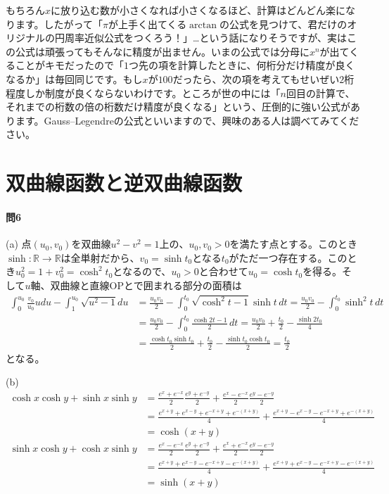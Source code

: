 もちろん$x$に放り込む数が小さくなれば小さくなるほど、計算はどんどん楽になります。したがって「$\pi$が上手く出てくる$\arctan$の公式を見つけて、君だけのオリジナルの円周率近似公式をつくろう！」…という話になりそうですが、実はこの公式は頑張ってもそんなに精度が出ません。いまの公式では分母に$x^n$が出てくることがキモだったので「$1$つ先の項を計算したときに、何桁分だけ精度が良くなるか」は毎回同じです。もし$x$が$100$だったら、次の項を考えてもせいぜい$2$桁程度しか制度が良くならないわけです。ところが世の中には「$n$回目の計算で、それまでの桁数の倍の桁数だけ精度が良くなる」という、圧倒的に強い公式があります。Gauss--Legendreの公式といいますので、興味のある人は調べてみてください。

\section{双曲線函数と逆双曲線函数}


\paragraph{問6}
(a) 点$(u_0,v_0)$を双曲線$u^2-v^2=1$上の、$u_0,v_0>0$を満たす点とする。このとき$\sinh\colon\mathbb{R}\rightarrow\mathbb{R}$は全単射だから、$v_0=\sinh t_0$となる$t_0$がただ一つ存在する。このとき$u_0^2=1+v_0^2=\cosh^2 t_0$となるので、$u_0>0$と合わせて$u_0=\cosh t_0$を得る。そして$u$軸、双曲線と直線$\mathrm{OP}$とで囲まれる部分の面積は
\begin{align*}
\int_0^{u_0} \frac{v_0}{u_0}u du - \int_1^{u_0} \sqrt{u^2-1} du
&= \frac{u_0v_0}{2} - \int_0^{t_0} \sqrt{\cosh^2 t -1} \sinh t \,dt 
= \frac{u_0v_0}{2} - \int_0^{t_0} \sinh^2 t \,dt  \\
&= \frac{u_0v_0}{2} - \int_0^{t_0} \frac{\cosh 2t - 1}{2} \,dt
= \frac{u_0v_0}{2} + \frac{t_0}{2} - \frac{\sinh 2t_0}{4} \\
&= \frac{\cosh t_0 \sinh t_0}{2} + \frac{t_0}{2} - \frac{\sinh t_0 \cosh t_0}{2} = \frac{t_0}{2}
\end{align*}
となる。

(b)
\begin{align*}
\cosh x \cosh y + \sinh x \sinh y
&= \frac{e^x + e^{-x}}{2} \frac{e^y + e^{-y}}{2} + \frac{e^x - e^{-x}}{2}\frac{e^y - e^{-y}}{2} \\
&= \frac{e^{x+y} + e^{x-y} + e^{-x+y} + e^{-(x+y)}}{4} + \frac{e^{x+y} - e^{x-y} - e^{-x+y} + e^{-(x+y)}}{4} \\
&= \cosh(x+y) \\
\sinh x \cosh y + \cosh x \sinh y
&= \frac{e^x - e^{-x}}{2} \frac{e^y + e^{-y}}{2} + \frac{e^x + e^{-x}}{2}\frac{e^y - e^{-y}}{2} \\
&= \frac{e^{x+y} + e^{x-y} - e^{-x+y} - e^{-(x+y)}}{4} + \frac{e^{x+y} + e^{x-y} - e^{-x+y} - e^{-(x+y)}}{4} \\
&= \sinh(x+y)
\end{align*}

